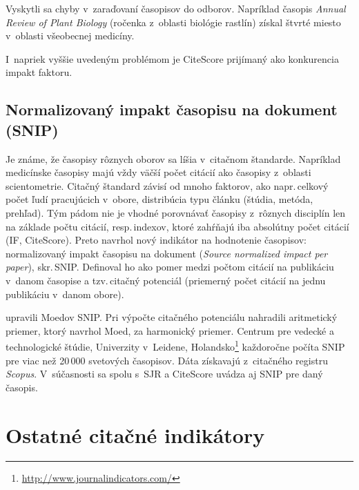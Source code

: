Vyskytli sa chyby v~zaraďovaní časopisov do odborov.  Napríklad časopis
\emph{Annual Review of Plant Biology} (ročenka z~oblasti biológie rastlín)
získal štvrté miesto v~oblasti všeobecnej medicíny.

I~napriek vyššie uvedeným problémom je CiteScore prijímaný ako konkurencia
impakt faktoru.

\subsection{Normalizovaný impakt časopisu na dokument (SNIP)}
\label{sec:snip}

Je známe, že časopisy rôznych oborov sa líšia v~citačnom štandarde.  Napríklad
medicínske časopisy majú vždy väčší počet citácií ako časopisy z~oblasti
scientometrie.  Citačný štandard závisí od mnoho faktorov, ako napr.\,celkový
počet ľudí pracujúcich v~obore, distribúcia typu článku (štúdia, metóda,
prehľad).  Tým pádom nie je vhodné porovnávať časopisy z~rôznych disciplín len
na základe počtu citácií, resp.\,indexov, ktoré zahŕňajú iba absolútny počet
citácií (IF, CiteScore).  Preto \citet{Moed2010} navrhol nový indikátor na
hodnotenie časopisov: normalizovaný impakt časopisu na dokument (\emph{Source
  normalized impact per paper}), skr.\,SNIP.  Definoval ho ako pomer medzi
počtom citácií na publikáciu v~danom časopise a tzv.\,citačný potenciál
(priemerný počet citácií na jednu publikáciu v~danom obore).

\citet{Waltman2013} upravili Moedov SNIP.  Pri výpočte citačného potenciálu
nahradili aritmetický priemer, ktorý navrhol Moed, za harmonický priemer.
Centrum pre vedecké a technologické štúdie, Univerzity v~Leidene,
Holandsko\footnote{\url{http://www.journalindicators.com/}} každoročne počíta
SNIP pre viac než 20\,000 svetových časopisov.  Dáta získavajú z~citačného
registru \emph{Scopus}.  V~súčasnosti sa spolu s~SJR a CiteScore uvádza aj SNIP
pre daný časopis.

\section{Ostatné citačné indikátory}

